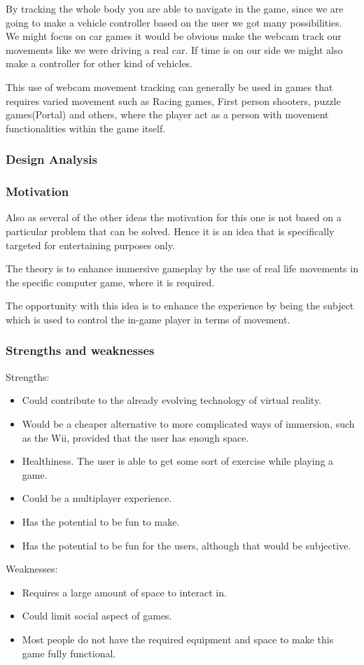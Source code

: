 By tracking the whole body you are able to navigate in the game, since we are going to make a vehicle controller based on the user we got many possibilities. We might focus on car games it would be obvious make the webcam track our movements like we were driving a real car. If time is on our side we might also make a controller for other kind of vehicles. 


This use of webcam movement tracking can generally be used in games that requires varied movement such as Racing games, First person shooters, puzzle games(Portal) and others, where the player act as a person with movement functionalities within the game itself.

\subsubsection*{Design Analysis}
\subsubsection*{Motivation}
Also as several of the other ideas the motivation for this one is not based on a particular problem that can be solved. Hence it is an idea that is specifically targeted for entertaining purposes only.


The theory is to enhance immersive gameplay by the use of real life movements in the specific computer game, where it is required.


The opportunity with this idea is to enhance the experience by being the subject which is used to control the in-game player in terms of movement.


\subsubsection*{Strengths and weaknesses}
Strengths:
\begin{itemize}
\item Could contribute to the already evolving technology of virtual reality.
\item Would be a cheaper alternative to more complicated ways of immersion, such as the Wii, provided that the user has enough space.
\item Healthiness. The user is able to get some sort of exercise while playing a game.
\item Could be a multiplayer experience.
\item Has the potential to be fun to make.
\item Has the potential to be fun for the users, although that would be subjective.
\end{itemize}
Weaknesses:
\begin{itemize}
\item Requires a large amount of space to interact in.
\item Could limit social aspect of games.
\item Most people do not have the required equipment and space to make this game fully functional.
\end{itemize}


